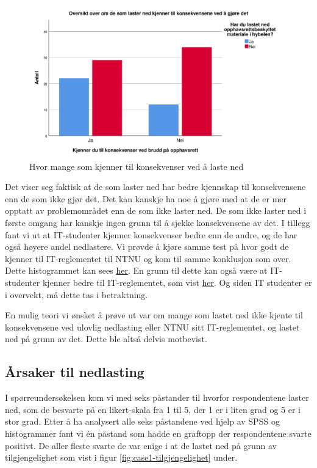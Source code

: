 \begin{figure}[H]
    \centering
    \includegraphics[scale=0.45]{case_1/bilder/konsekvens_lasterned.pdf}
    \caption[Konsekvens av å laste ned]{Hvor mange som kjenner til konsekvenser ved å laste ned}
    \label{fig:case1-konsekvens_lasterned}
\end{figure}

Det viser seg faktisk at de som laster ned har bedre kjennskap til konsekvensene enn de som ikke gjør det. Det kan kanskje ha noe å gjøre med at de er mer opptatt av problemområdet enn de som ikke laster ned. De som ikke laster ned i første omgang har kanskje ingen grunn til å sjekke konsekvensene av det. I tillegg fant vi ut at IT-studenter kjenner konsekvenser bedre enn de andre, og de har også høyere andel nedlastere. Vi prøvde å kjøre samme test på hvor godt de kjenner til IT-reglementet til NTNU \cite{ITReg} og kom til samme konklusjon som over. Dette histogrammet kan sees \hyperref[fig:reglement-lasterned]{her}. En grunn til dette kan også være at IT-studenter kjenner bedre til IT-reglementet, som vist \hyperref[fig:reglement-fakultet]{her}. Og siden IT studenter er i overvekt, må dette tas i betraktning. 

En mulig teori vi ønsket å prøve ut var om mange som lastet ned ikke kjente til konsekvensene ved ulovlig nedlasting eller NTNU sitt IT-reglementet, og lastet ned på grunn av det. Dette ble altså delvis motbevist. 

\subsection{Årsaker til nedlasting}
I spørreundersøkelsen kom vi med seks påstander til hvorfor respondentene laster ned, som de besvarte på en likert-skala fra 1 til 5, der 1 er i liten grad og 5 er i stor grad. Etter å ha analysert alle seks påstandene ved hjelp av SPSS og histogrammer fant vi én påstand som hadde en graftopp der respondentene svarte positivt. De aller fleste svarte de var enige i at de lastet ned på grunn av tilgjengelighet som vist i figur \ref{fig:case1-tilgjengelighet} under.

